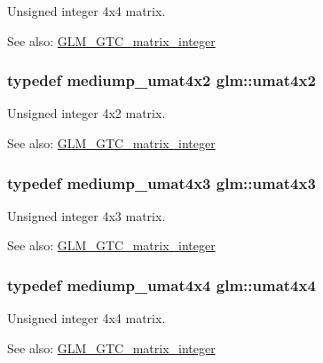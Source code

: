 Unsigned integer 4x4 matrix. \begin{Desc}
\item[See also:]\hyperlink{group__gtc__matrix__integer}{GLM\_\-GTC\_\-matrix\_\-integer} \end{Desc}
\hypertarget{group__gtc__matrix__integer_g13e8392218e9b6e1b7f194a21b5c88bf}{
\subsubsection[umat4x2]{\setlength{\rightskip}{0pt plus 5cm}typedef mediump\_\-umat4x2 {\bf glm::umat4x2}}}
\label{group__gtc__matrix__integer_g13e8392218e9b6e1b7f194a21b5c88bf}


Unsigned integer 4x2 matrix. \begin{Desc}
\item[See also:]\hyperlink{group__gtc__matrix__integer}{GLM\_\-GTC\_\-matrix\_\-integer} \end{Desc}
\hypertarget{group__gtc__matrix__integer_g08373f5588a54da1a48e5e55c7d51004}{
\subsubsection[umat4x3]{\setlength{\rightskip}{0pt plus 5cm}typedef mediump\_\-umat4x3 {\bf glm::umat4x3}}}
\label{group__gtc__matrix__integer_g08373f5588a54da1a48e5e55c7d51004}


Unsigned integer 4x3 matrix. \begin{Desc}
\item[See also:]\hyperlink{group__gtc__matrix__integer}{GLM\_\-GTC\_\-matrix\_\-integer} \end{Desc}
\hypertarget{group__gtc__matrix__integer_ge0931b79e808fb0983848778a60eb548}{
\subsubsection[umat4x4]{\setlength{\rightskip}{0pt plus 5cm}typedef mediump\_\-umat4x4 {\bf glm::umat4x4}}}
\label{group__gtc__matrix__integer_ge0931b79e808fb0983848778a60eb548}


Unsigned integer 4x4 matrix. \begin{Desc}
\item[See also:]\hyperlink{group__gtc__matrix__integer}{GLM\_\-GTC\_\-matrix\_\-integer} \end{Desc}
